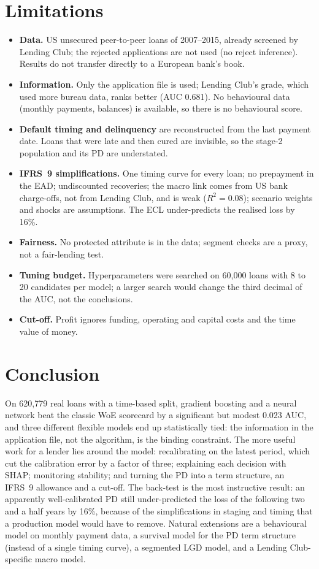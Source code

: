 \documentclass[11pt,a4paper]{article}
\begin{document}
\section{Limitations}
\label{sec:limits}
\begin{itemize}
  \item \textbf{Data.} US unsecured peer-to-peer loans of 2007--2015, already screened by Lending Club; the rejected applications are not used (no reject inference). Results do not transfer directly to a European bank's book.
  \item \textbf{Information.} Only the application file is used; Lending Club's grade, which used more bureau data, ranks better (AUC 0.681). No behavioural data (monthly payments, balances) is available, so there is no behavioural score.
  \item \textbf{Default timing and delinquency} are reconstructed from the last payment date. Loans that were late and then cured are invisible, so the stage-2 population and its PD are understated.
  \item \textbf{IFRS~9 simplifications.} One timing curve for every loan; no prepayment in the EAD; undiscounted recoveries; the macro link comes from US bank charge-offs, not from Lending Club, and is weak ($R^2 = 0.08$); scenario weights and shocks are assumptions. The ECL under-predicts the realised loss by 16\%.
  \item \textbf{Fairness.} No protected attribute is in the data; segment checks are a proxy, not a fair-lending test.
  \item \textbf{Tuning budget.} Hyperparameters were searched on 60{,}000 loans with 8 to 20 candidates per model; a larger search would change the third decimal of the AUC, not the conclusions.
  \item \textbf{Cut-off.} Profit ignores funding, operating and capital costs and the time value of money.
\end{itemize}

\section{Conclusion}
On 620{,}779 real loans with a time-based split, gradient boosting and a neural network beat the classic WoE scorecard by a significant but modest 0.023 AUC, and three different flexible models end up statistically tied: the information in the application file, not the algorithm, is the binding constraint. The more useful work for a lender lies around the model: recalibrating on the latest period, which cut the calibration error by a factor of three; explaining each decision with SHAP; monitoring stability; and turning the PD into a term structure, an IFRS~9 allowance and a cut-off. The back-test is the most instructive result: an apparently well-calibrated PD still under-predicted the loss of the following two and a half years by 16\%, because of the simplifications in staging and timing that a production model would have to remove. Natural extensions are a behavioural model on monthly payment data, a survival model for the PD term structure (instead of a single timing curve), a segmented LGD model, and a Lending Club-specific macro model.
\end{document}

